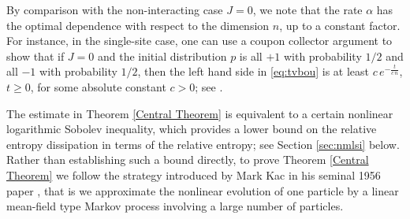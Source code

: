 \documentclass[11pt,reqno]{amsart}
\numberwithin{equation}{section}
\numberwithin{figure}{section}
\newtheorem{remark}[theorem]{Remark}
\newcommand{\1}{\mathds{1}}
\newcommand{\what}{$\clubsuit\otimes\clubsuit$}
\let\a=\alpha \let\b=\beta \let\g=\gamma \let\d=\delta
\newcommand{\cA}{\ensuremath{\mathcal A}}
\begin{document}
By comparison with the non-interacting case $J=0$, we note that the rate $\a$ has the optimal dependence with respect to the dimension $n$, up to a constant factor. For instance, in the single-site case, one can use a coupon collector argument to show that if $J=0$ and the initial distribution $p$ is all $+1$ with probability $1/2$  and all $-1$ with probability $1/2$, then the left hand side in \eqref{eq:tvbou} is at least $c\,e^{-\frac{t}{c\,n}}$, $t\ge 0$, for some absolute constant $c>0$; see \cite{AC2024nonlinear}. 


The estimate in Theorem \ref{Central Theorem} %
is equivalent to a certain nonlinear logarithmic Sobolev inequality, which provides a lower bound on the relative entropy dissipation in terms of the relative entropy; see Section \ref{sec:nmlsi} below. %
Rather than establishing such a bound directly, to prove Theorem \ref{Central Theorem} we follow the strategy introduced by Mark Kac in his seminal 1956 paper \cite{KAC}, that is we 
approximate the nonlinear evolution of one particle by a linear mean-field type Markov
process involving a large number of particles. 
\end{document}
